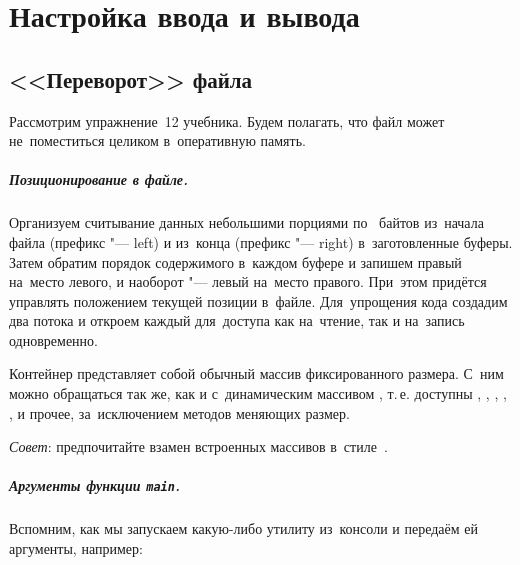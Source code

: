 
\chapter{Настройка ввода и вывода}

\section{<<Переворот>> файла}
Рассмотрим упражнение~12  учебника. Будем полагать, что файл может не~поместиться целиком в~оперативную память.




\paragraph{Позиционирование в файле.}
Организуем считывание данных небольшими порциями по~ байтов из~начала файла (префикс  "--- left) и из~конца (префикс  "--- right) в~заготовленные буферы. Затем обратим порядок содержимого в~каждом буфере и запишем правый на~место левого, и наоборот "--- левый на~место правого. При~этом придётся управлять положением текущей позиции в~файле. Для~упрощения кода создадим два потока и откроем каждый для~доступа как на~чтение, так и на~запись одновременно.


Контейнер  представляет собой обычный массив фиксированного размера. С~ним можно обращаться так же, как и с~динамическим массивом , т.\,е. доступны , , , , \code{[]},  и прочее, за~исключением методов меняющих размер.

\emph{Совет}: предпочитайте  взамен встроенных массивов в~стиле~.



\paragraph{Аргументы функции \texttt{main}.}
Вспомним, как мы запускаем какую-либо утилиту из~консоли и передаём ей аргументы, например:

